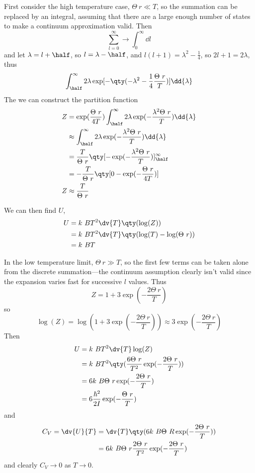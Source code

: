 First consider the high temperature case, $\Theta~r \ll T$, so the
summation can be replaced by an integral, assuming that there are a
large enough number of states to make a continuum approximation valid. Then
\[ \sum_{l=0}^{\infty} \to \int_0^{\infty} \dd{l} \] and let $\lambda
= l + \half$, so $l = \lambda - \half$, and $l(l+1) = \lambda^2 -
\frac{1}{4}$, so $2l+1 = 2 \lambda$, thus
\[ \int_{\half}^{\infty} 2 \lambda \exp[- \qty(- \lambda^2 - \frac{1}{4}
\frac{\Theta~r}{T} )] \dd{\lambda} \] The we can construct the
partition function
\begin{align*}
  Z &= \exp( \frac{\Theta~r}{4 T} ) \int_{\half}^{\infty} 2 \lambda \exp( - \frac{\lambda^2 \Theta~r}{T} ) \dd{\lambda} \\ 
& \approx \int_{\half}^{\infty} 2 \lambda \exp( - \frac{\lambda^2 \Theta~r}{T} ) \dd{\lambda} \\
& = \frac{T}{\Theta~r} \qty[ - \exp( - \frac{\lambda^2 \Theta~r}{T} )]^{\infty}_{\half} \\
& = - \frac{T}{\Theta~r} \qty[ 0 - \exp( - \frac{\Theta~r}{4 T} ) ] \\
Z & \approx \frac{T}{\Theta~r}
\end{align*}

We can then find $U$,
\begin{align*}
  U &= k~B T^2 \dv{T}\qty( \log(Z) ) \\
&= k~B T^2 \dv{T}\qty( \log(T) - \log(\Theta~r) ) \\ &= k~B T
\end{align*}

In the low temperature limit, $\Theta~r \gg T$, so the first few terms
can be taken alone from the discrete summation---the continuum
assumption clearly isn't valid since the expansion varies fast for
successive $l$ values. Thus
\begin{equation}
  \label{eq:29}
  Z = 1 + 3 \exp( - \frac{2 \Theta~r}{T} )
\end{equation}
so
\[\log(Z) = \log(1 + 3 \exp( - \frac{2 \Theta~r}{T} ) ) \approx 3 \exp(- \frac{2 \Theta~r}{T}) \]
Then
\begin{align*} 
U &= k~B T^2 \dv{T} \log(Z) \\ 
&= k~B T^2 \qty( \frac{6 \Theta~r}{T^2} \exp( - \frac{2 \Theta~r}{T}) ) \\
&= 6 k~B \Theta~r \exp( - \frac{2 \Theta~r}{T} ) \\
&= 6 \frac{\hbar^2}{2 I} \exp( - \frac{\Theta~r}{T}) 
\end{align*}
and 
\begin{align*}
  C_V = \dv{U}{T} &= \dv{T} \qty( 6 k~B \Theta~R \exp( - \frac{2 \Theta~r}{T} ) ) \\
&= 6 k~B \Theta~r \frac{2 \Theta~r}{T^2} \exp( - \frac{2 \Theta~r}{T} )
\end{align*}
and clearly $C_V \to 0$ as $T \to 0$.


